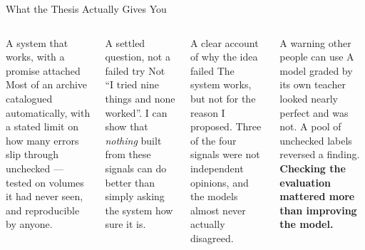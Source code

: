 \documentclass[aspectratio=169,11pt]{beamer}
\begin{document}
\begin{frame}{What the Thesis Actually Gives You}
\small
\begin{columns}[T]
\begin{exampleblock}{\small A system that works, with a promise attached}
\footnotesize Most of an archive catalogued automatically, with a stated limit on how many errors slip through unchecked --- tested on volumes it had never seen, and reproducible by anyone.
\end{exampleblock}
\vspace{1mm}
\begin{exampleblock}{\small A settled question, not a failed try}
\footnotesize Not ``I tried nine things and none worked''. I can show that \emph{nothing} built from these signals can do better than simply asking the system how sure it is.
\end{exampleblock}

\begin{block}{\small A clear account of why the idea failed}
\footnotesize The system works, but not for the reason I proposed. Three of the four signals were not independent opinions, and the models almost never actually disagreed.
\end{block}
\vspace{1mm}
\begin{block}{\small A warning other people can use}
\footnotesize A model graded by its own teacher looked nearly perfect and was not. A pool of unchecked labels reversed a finding. \textbf{Checking the evaluation mattered more than improving the model.}
\end{block}
\end{columns}
\end{frame}
\end{document}
